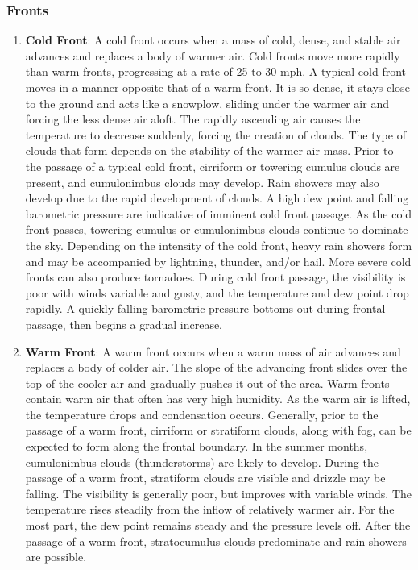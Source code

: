 \documentclass[12pt]{article}
\begin{document}
		\subsubsection{Fronts}
			\begin{enumerate}
				\item \textbf{Cold Front}: A cold front occurs when a mass of cold, dense, and stable air advances and replaces a body of warmer air. Cold fronts move more rapidly than warm fronts, progressing at a rate of 25 to 30 mph. A typical cold front moves in a manner opposite that of a warm front. It is so dense, it stays close to the ground and acts like a snowplow, sliding under the warmer air and forcing the less dense air aloft. The rapidly ascending air causes the temperature to decrease suddenly, forcing the creation of clouds. The type of clouds that form depends on the stability of the warmer air mass. Prior to the passage of a typical cold front, cirriform or towering cumulus clouds are present, and cumulonimbus clouds may develop. Rain showers may also develop due to the rapid development of clouds. A high dew point and falling barometric pressure are indicative of imminent cold front passage. As the cold front passes, towering cumulus or cumulonimbus clouds continue to dominate the sky. Depending on the intensity of the cold front, heavy rain showers form and may be accompanied by lightning, thunder, and/or hail. More severe cold fronts can also produce tornadoes. During cold front passage, the visibility is poor with winds variable and gusty, and the temperature and dew point drop rapidly. A quickly falling barometric pressure bottoms out during frontal passage, then begins a gradual increase.
				\item \textbf{Warm Front}: A warm front occurs when a warm mass of air advances and replaces a body of colder air.  The slope of the advancing front slides over the top of the cooler air and gradually pushes it out of the area. Warm fronts contain warm air that often has very high humidity. As the warm air is lifted, the temperature drops and condensation occurs. Generally, prior to the passage of a warm front, cirriform or stratiform clouds, along with fog, can be expected to form along the frontal boundary. In the summer months, cumulonimbus clouds (thunderstorms) are likely to develop. During the passage of a warm front, stratiform clouds are visible and drizzle may be falling. The visibility is generally poor, but improves with variable winds. The temperature rises steadily from the inflow of relatively warmer air. For the most part, the dew point remains steady and the pressure levels off. After the passage of a warm front, stratocumulus clouds predominate and rain showers are possible.  

\end{enumerate}
\end{document}
